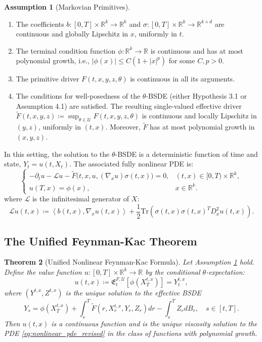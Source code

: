 \documentclass[12pt, letterpaper]{amsart}
\newcommand{\Efrak}{\mathfrak{E}}
\newcommand{\Efrakgen}{\Efrak^{F, \Ucal}}
\newcommand{\Ucal}{\mathcal{U}}
\newcommand{\R}{\mathbb{R}}
\newcommand{\scpr}[2]{\left\langle #1, #2 \right\rangle}
\newcommand{\Tr}{\mathrm{Tr}}
\theoremstyle{plain}
\newtheorem{theorem}{Theorem}[section]
\theoremstyle{definition}
\newtheorem{assumption}[theorem]{Assumption}
\theoremstyle{remark}
\numberwithin{equation}{section} %
\begin{document}
\begin{assumption}[Markovian Primitives] \label{ass:fk_primitives}
\begin{enumerate}[label=(\roman*)]
    \item The coefficients $b: [0,T]\times\R^k \to \R^k$ and $\sigma: [0,T]\times\R^k \to \R^{k\times d}$ are continuous and globally Lipschitz in $x$, uniformly in $t$.
    \item The terminal condition function $\phi: \R^k \to \R$ is continuous and has at most polynomial growth, i.e., $|\phi(x)| \le C(1+|x|^p)$ for some $C,p > 0$.
    \item The primitive driver $F(t,x,y,z,\theta)$ is continuous in all its arguments.
    \item The conditions for well-posedness of the $\theta$-BSDE (either Hypothesis 3.1 or Assumption 4.1) are satisfied. The resulting single-valued effective driver $\tilde{F}(t,x,y,z) \coloneqq \sup_{\theta \in \Ucal} F(t,x,y,z,\theta)$ is continuous and locally Lipschitz in $(y,z)$, uniformly in $(t,x)$. Moreover, $\tilde{F}$ has at most polynomial growth in $(x,y,z)$.
\end{enumerate}
\end{assumption}

In this setting, the solution to the $\theta$-BSDE is a deterministic function of time and state, $Y_t = u(t, X_t)$. The associated fully nonlinear PDE is:
\begin{equation}
\label{eq:nonlinear_pde_revised}
\begin{cases}
    -\partial_t u - \mathcal{L}u - \tilde{F}\big(t, x, u, (\nabla_x u)\sigma(t,x)\big) = 0, & (t,x) \in [0,T) \times \R^k, \\
    u(T,x) = \phi(x), & x \in \R^k.
\end{cases}
\end{equation}
where $\mathcal{L}$ is the infinitesimal generator of $X$:
\[ \mathcal{L}u(t,x) \coloneqq \scpr{b(t,x)}{\nabla_x u(t,x)} + \frac{1}{2} \Tr\left(\sigma(t,x)\sigma(t,x)^T D^2_x u(t,x)\right). \]

\subsection{The Unified Feynman-Kac Theorem}

\begin{theorem}[Unified Nonlinear Feynman-Kac Formula]
\label{thm:feynman_kac_unified}
Let Assumption \ref{ass:fk_primitives} hold. Define the value function $u: [0,T]\times\R^k \to \R$ by the conditional $\theta$-expectation:
\[ u(t,x) \coloneqq \Efrakgen_t[\phi(X_T^{t,x})] = Y_t^{t,x}, \]
where $(Y^{t,x}, Z^{t,x})$ is the unique solution to the effective BSDE
\begin{equation} \label{eq:effective_bsde_fk}
 Y_s = \phi(X_T^{t,x}) + \int_s^T \tilde{F}(r, X_r^{t,x}, Y_r, Z_r) dr - \int_s^T Z_r dB_r, \quad s \in [t,T].
\end{equation}
Then $u(t,x)$ is a continuous function and is the unique viscosity solution to the PDE \eqref{eq:nonlinear_pde_revised} in the class of functions with polynomial growth.
\end{theorem}
\end{document}

